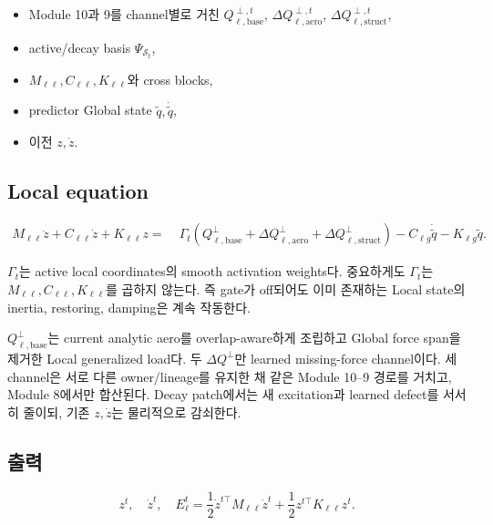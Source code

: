 \documentclass[11pt,a4paper]{article}
\begin{document}
\begin{itemize}[leftmargin=1.5em]
  \item Module 10과 9를 channel별로 거친
  \(Q_{\ell,\mathrm{base}}^{\perp,t}\),
  \(\Delta Q_{\ell,\mathrm{aero}}^{\perp,t}\),
  \(\Delta Q_{\ell,\mathrm{struct}}^{\perp,t}\),
  \item active/decay basis \(\Psi_{\mathcal S_t}\),
  \item \(M_{\ell\ell},C_{\ell\ell},K_{\ell\ell}\)와 cross blocks,
  \item predictor Global state \(\widetilde q,\dot{\widetilde q}\),
  \item 이전 \(z,\dot z\).
\end{itemize}

\subsection*{Local equation}

\begin{equation}
\begin{aligned}
  M_{\ell\ell}\ddot z
  +C_{\ell\ell}\dot z
  +K_{\ell\ell}z
  =&\;
  \Gamma_t\left(
  Q_{\ell,\mathrm{base}}^{\perp}
  +\Delta Q_{\ell,\mathrm{aero}}^{\perp}
  +\Delta Q_{\ell,\mathrm{struct}}^{\perp}
  \right)
  -C_{\ell g}\dot{\widetilde q}
  -K_{\ell g}\widetilde q.
  \label{eq:local-dynamics}
\end{aligned}
\end{equation}

\(\Gamma_t\)는 active local coordinates의 smooth activation weights다.
중요하게도 \(\Gamma_t\)는 \(M_{\ell\ell},C_{\ell\ell},K_{\ell\ell}\)를 곱하지 않는다.
즉 gate가 off되어도 이미 존재하는 Local state의 inertia, restoring, damping은 계속 작동한다.

\(Q_{\ell,\mathrm{base}}^{\perp}\)는 current analytic aero를 overlap-aware하게 조립하고
Global force span을 제거한 Local generalized load다.
두 \(\Delta Q^\perp\)만 learned missing-force channel이다.
세 channel은 서로 다른 owner/lineage를 유지한 채 같은 Module 10--9 경로를 거치고,
Module 8에서만 합산된다.
Decay patch에서는 새 excitation과 learned defect를 서서히 줄이되,
기존 \(z,\dot z\)는 물리적으로 감쇠한다.

\subsection*{출력}

\begin{equation}
  z^t,\quad\dot z^t,\quad
  E_{\ell}^t
  =
  \frac12\dot z^{t\top}M_{\ell\ell}\dot z^t
  +
  \frac12 z^{t\top}K_{\ell\ell}z^t.
\end{equation}
\end{document}
